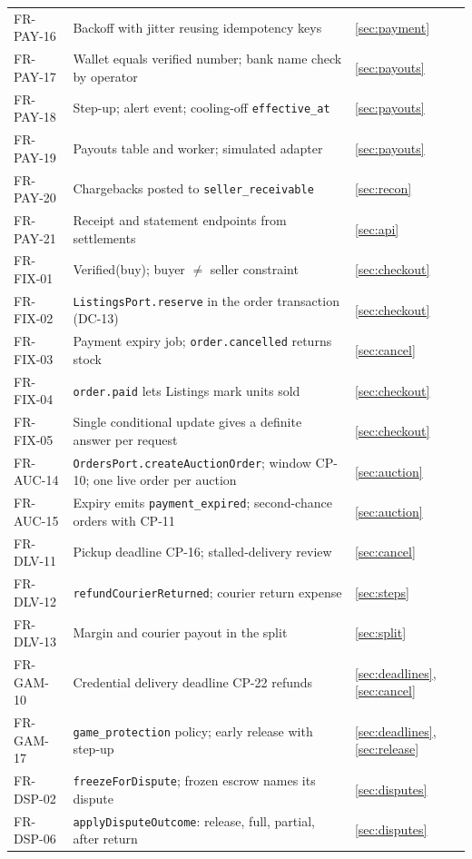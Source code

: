 \documentclass[11pt,a4paper]{article}
\begin{document}
{\begin{longtable}{@{}>{\ttfamily}p{2.4cm}>{\raggedright\arraybackslash}p{10.6cm}>{\raggedright\arraybackslash}p{2.2cm}@{}}
FR-PAY-16 & Backoff with jitter reusing idempotency keys & \ref{sec:payment} \\
FR-PAY-17 & Wallet equals verified number; bank name check by operator & \ref{sec:payouts} \\
FR-PAY-18 & Step-up; alert event; cooling-off \texttt{effective\_at} & \ref{sec:payouts} \\
FR-PAY-19 & Payouts table and worker; simulated adapter & \ref{sec:payouts} \\
FR-PAY-20 & Chargebacks posted to \texttt{seller\_receivable} & \ref{sec:recon} \\
FR-PAY-21 & Receipt and statement endpoints from settlements & \ref{sec:api} \\
FR-FIX-01 & Verified(buy); buyer $\neq$ seller constraint & \ref{sec:checkout} \\
FR-FIX-02 & \texttt{ListingsPort.reserve} in the order transaction (DC-13) & \ref{sec:checkout} \\
FR-FIX-03 & Payment expiry job; \texttt{order.cancelled} returns stock & \ref{sec:cancel} \\
FR-FIX-04 & \texttt{order.paid} lets Listings mark units sold & \ref{sec:checkout} \\
FR-FIX-05 & Single conditional update gives a definite answer per request & \ref{sec:checkout} \\
FR-AUC-14 & \texttt{OrdersPort.createAuctionOrder}; window CP-10; one live order per auction & \ref{sec:auction} \\
FR-AUC-15 & Expiry emits \texttt{payment\_expired}; second-chance orders with CP-11 & \ref{sec:auction} \\
FR-DLV-11 & Pickup deadline CP-16; stalled-delivery review & \ref{sec:cancel} \\
FR-DLV-12 & \texttt{refundCourierReturned}; courier return expense & \ref{sec:steps} \\
FR-DLV-13 & Margin and courier payout in the split & \ref{sec:split} \\
FR-GAM-10 & Credential delivery deadline CP-22 refunds & \ref{sec:deadlines}, \ref{sec:cancel} \\
FR-GAM-17 & \texttt{game\_protection} policy; early release with step-up & \ref{sec:deadlines}, \ref{sec:release} \\
FR-DSP-02 & \texttt{freezeForDispute}; frozen escrow names its dispute & \ref{sec:disputes} \\
FR-DSP-06 & \texttt{applyDisputeOutcome}: release, full, partial, after return & \ref{sec:disputes} \\

\end{longtable}}
\end{document}
